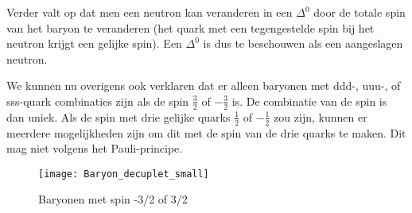 Verder valt op dat men een neutron kan veranderen in een $\Delta^{0}$
door de totale spin van het baryon te veranderen (het quark met een
tegengestelde spin bij het neutron krijgt een gelijke spin). Een $\Delta^{0}$
is dus te beschouwen als een aangeslagen neutron. 

We kunnen nu overigens ook verklaren dat er alleen baryonen met ddd-,
uuu-, of sss-quark combinaties zijn als de spin $\frac{3}{2}$ of
$-\frac{3}{2}$ is. De combinatie van de spin is dan uniek. Als de
spin met drie gelijke quarks $\frac{1}{2}$ of $-\frac{1}{2}$ zou
zijn, kunnen er meerdere mogelijkheden zijn om dit met de spin van
de drie quarks te maken. Dit mag niet volgens het Pauli-principe.

\begin{figure}[H]
\noindent \begin{centering}
\texttt{[image: Baryon\_decuplet\_small]}
\par\end{centering}

\caption{Baryonen met spin -3/2 of 3/2}
\end{figure}


